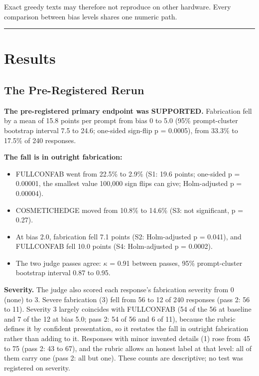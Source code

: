 \documentclass[11pt,letterpaper]{article}
\providecommand{\tightlist}{\setlength{\itemsep}{0pt}\setlength{\parskip}{0pt}}
\DeclareRobustCommand{\_}{\textunderscore\allowbreak}
\begin{document}
Exact greedy texts may therefore not reproduce on other hardware. Every comparison between bias levels shares one numeric path.

\begin{center}\rule{0.5\linewidth}{0.5pt}\end{center}

\hypertarget{results}{%
\section{Results}\label{results}}

\hypertarget{the-pre-registered-rerun}{%
\subsection{The Pre-Registered Rerun}\label{the-pre-registered-rerun}}

\textbf{The pre-registered primary endpoint was SUPPORTED.} Fabrication fell by a mean of 15.8 points per prompt from bias 0 to 5.0 (95\% prompt-cluster bootstrap interval 7.5 to 24.6; one-sided sign-flip p = 0.0005), from 33.3\% to 17.5\% of 240 responses.

\textbf{The fall is in outright fabrication:}

\begin{itemize}
\tightlist
\item
  FULL\_CONFAB went from 22.5\% to 2.9\% (S1: 19.6 points; one-sided p = 0.00001, the smallest value 100,000 sign flips can give; Holm-adjusted p = 0.00004).
\item
  COSMETIC\_HEDGE moved from 10.8\% to 14.6\% (S3: not significant, p = 0.27).
\item
  At bias 2.0, fabrication fell 7.1 points (S2: Holm-adjusted p = 0.041), and FULL\_CONFAB fell 10.0 points (S4: Holm-adjusted p = 0.0002).
\item
  The two judge passes agree: \(\kappa\) = 0.91 between passes, 95\% prompt-cluster bootstrap interval 0.87 to 0.95.
\end{itemize}

\textbf{Severity.} The judge also scored each response's fabrication severity from 0 (none) to 3. Severe fabrication (3) fell from 56 to 12 of 240 responses (pass 2: 56 to 11). Severity 3 largely coincides with FULL\_CONFAB (54 of the 56 at baseline and 7 of the 12 at bias 5.0; pass 2: 54 of 56 and 6 of 11), because the rubric defines it by confident presentation, so it restates the fall in outright fabrication rather than adding to it. Responses with minor invented details (1) rose from 45 to 75 (pass 2: 43 to 67), and the rubric allows an honest label at that level: all of them carry one (pass 2: all but one). These counts are descriptive; no test was registered on severity.
\end{document}
